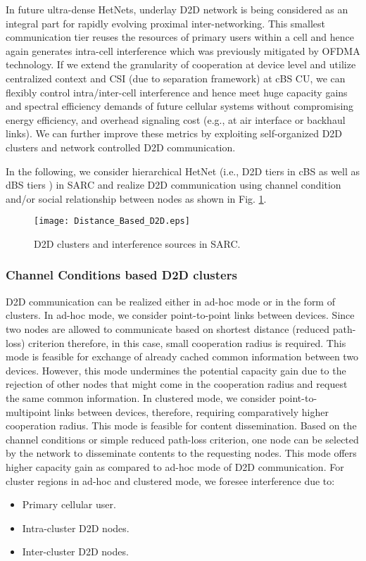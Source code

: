 \documentclass[article,10pt,twocolumn]{IEEEtran}
\begin{document}
In future ultra-dense HetNets, underlay D2D network is being considered as an integral part for rapidly evolving proximal inter-networking. This smallest communication tier reuses the resources of primary users within a cell and hence again generates intra-cell interference which was previously mitigated by OFDMA technology. If we extend the granularity of cooperation at device level and utilize centralized context and CSI (due to separation framework) at cBS CU, we can flexibly control intra/inter-cell interference and hence meet huge capacity gains and spectral efficiency demands of future cellular systems without compromising energy efficiency, and overhead signaling cost (e.g., at air interface or backhaul links). We can further improve these metrics by exploiting self-organized D2D clusters and network controlled D2D communication.

In the following, we consider hierarchical HetNet (i.e., D2D tiers in cBS as well as dBS tiers \citep{7063540}) in SARC and realize D2D communication using channel condition and/or social relationship between nodes as shown in Fig. \ref{Figure:distancebasedd2d}.
\begin{figure}[!thb]
\centering
\texttt{[image: Distance\_Based\_D2D.eps]}
\caption{D2D clusters and interference sources in SARC.}\label{Figure:distancebasedd2d}
\vspace{-4mm}
\end{figure}
\subsubsection{Channel Conditions based D2D clusters}
D2D communication can be realized either in ad-hoc mode or in the form of clusters. In ad-hoc mode, we consider point-to-point links between devices. Since two nodes are allowed to communicate based on shortest distance (reduced path-loss) criterion therefore, in this case, small cooperation radius is required. This mode is feasible for exchange of already cached common information between two devices. However, this mode undermines the potential capacity gain due to the rejection of other nodes that might come in the cooperation radius and request the same common information.
In clustered mode, we consider point-to-multipoint links between devices, therefore, requiring comparatively higher cooperation radius. This mode is feasible for content dissemination. Based on the channel conditions or simple reduced path-loss criterion, one node can be selected by the network to disseminate contents to the requesting nodes. This mode offers higher capacity gain as compared to ad-hoc mode of D2D communication. For cluster regions in ad-hoc and clustered mode, we foresee interference due to:
\begin{itemize}
\item Primary cellular user.
\item Intra-cluster D2D nodes.
\item Inter-cluster D2D nodes.
\end{itemize}
\end{document}
